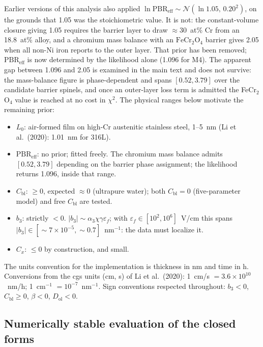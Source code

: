 Earlier versions of this analysis also applied
$\ln \mathrm{PBR}_{\mathrm{eff}} \sim \mathcal{N}(\ln 1.05,\, 0.20^2)$,
on the grounds that 1.05 was the stoichiometric value. It is not: the
constant-volume closure giving 1.05 requires the barrier layer to draw
$\approx 30$~at\% Cr from an 18.8~at\% alloy, and a chromium mass balance
with an $\mathrm{FeCr_2O_4}$ barrier gives 2.05 when all non-Ni iron
reports to the outer layer. That prior has been removed;
$\mathrm{PBR}_{\mathrm{eff}}$ is now determined by the likelihood alone
(1.096 for M4). The apparent gap between 1.096 and 2.05 is examined in
the main text and does not survive: the mass-balance figure is
phase-dependent and spans $[0.52, 3.79]$ over the candidate barrier
spinels, and once an outer-layer loss term is admitted the FeCr$_2$O$_4$
value is reached at no cost in $\chi^2$. The physical ranges below
motivate the remaining prior:
\begin{itemize}
\item $L_0$: air-formed film on high-Cr austenitic stainless steel, 1--5~nm
(Li et al.\ (2020): 1.01~nm for 316L).
\item $\mathrm{PBR}_{\mathrm{eff}}$: no prior; fitted freely. The
chromium mass balance admits $[0.52, 3.79]$ depending on the barrier
phase assignment; the likelihood returns 1.096, inside that range.
\item $C_{\mathrm{bl}}$: $\ge 0$, expected $\approx 0$ (ultrapure water); both
$C_{\mathrm{bl}} = 0$ (five-parameter model) and free $C_{\mathrm{bl}}$ are
tested.
\item $b_3$: strictly $< 0$. $|b_3| \sim \alpha_3 \chi \gamma \varepsilon_f$;
with $\varepsilon_f \in [10^2, 10^6]$~V/cm this spans
$|b_3| \in [\sim 7 \times 10^{-5}, \sim 0.7]$~nm$^{-1}$: the data must localize it.
\item $C_x$: $\le 0$ by construction, and small.
\end{itemize}

The units convention for the implementation is thickness in nm and time in h.
Conversions from the cgs units (cm, s) of Li et al.\ (2020):
1~cm/s $= 3.6 \times 10^{10}$~nm/h; 1~cm$^{-1}$ $= 10^{-7}$~nm$^{-1}$.
Sign conventions respected throughout: $b_3 < 0$, $C_{\mathrm{bl}} \ge 0$,
$\beta < 0$, $D_{\mathrm{ol}} < 0$.

\subsection{Numerically stable evaluation of the closed forms}
\label{sec:logspace}

